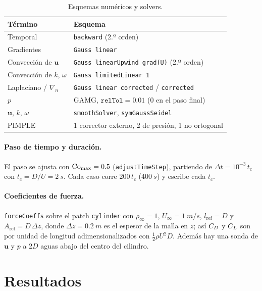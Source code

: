 \begin{table}[H]
\centering
\small
\begin{tabular}{ll}
\toprule
Término & Esquema \\
\midrule
Temporal & \texttt{backward} (2.º orden) \\
Gradientes & \texttt{Gauss linear} \\
Convección de $\mathbf{u}$ & \texttt{Gauss linearUpwind grad(U)} (2.º orden) \\
Convección de $k$, $\omega$ & \texttt{Gauss limitedLinear 1} \\
Laplaciano / $\nabla_n$ & \texttt{Gauss linear corrected} / \texttt{corrected} \\
\midrule
$p$ & GAMG, $\texttt{relTol}=0.01$ (0 en el paso final) \\
$\mathbf{u}$, $k$, $\omega$ & \texttt{smoothSolver}, \texttt{symGaussSeidel} \\
PIMPLE & 1 corrector externo, 2 de presión, 1 no ortogonal \\
\bottomrule
\end{tabular}
\caption{Esquemas numéricos y solvers.}
\end{table}

\paragraph{Paso de tiempo y duración.} El paso se ajusta con $\mathrm{Co}_{\max}=0.5$ (\texttt{adjustTimeStep}), partiendo de $\Delta t = 10^{-3}\,t_c$ con $t_c = D/U = \SI{2}{s}$. Cada caso corre $200\,t_c$ ($\SI{400}{s}$) y escribe cada $t_c$.

\paragraph{Coeficientes de fuerza.} \texttt{forceCoeffs} sobre el patch \texttt{cylinder} con $\rho_\infty=1$, $U_\infty = \SI{1}{m/s}$, $l_{\mathrm{ref}} = D$ y $A_{\mathrm{ref}} = D\,\Delta z$, donde $\Delta z=\SI{0.2}{m}$ es el espesor de la malla en $z$; así $C_D$ y $C_L$ son por unidad de longitud adimensionalizados con $\tfrac12\rho U^2 D$. Además hay una sonda de $\mathbf{u}$ y $p$ a $2D$ aguas abajo del centro del cilindro.
\newpage
\section{Resultados}

